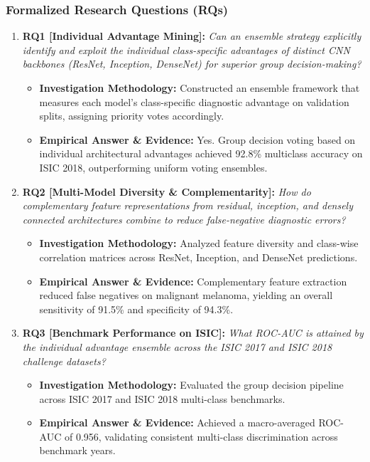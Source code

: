 \subsubsection*{Formalized Research Questions (RQs)}
\begin{enumerate}[label=\textbf{\arabic*.}, leftmargin=*]
  \item \textbf{RQ1 [Individual Advantage Mining]:} \textit{Can an ensemble strategy explicitly identify and exploit the individual class-specific advantages of distinct CNN backbones (ResNet, Inception, DenseNet) for superior group decision-making?}
  \begin{itemize}[leftmargin=1.5em]
    \item \textbf{Investigation Methodology:} Constructed an ensemble framework that measures each model's class-specific diagnostic advantage on validation splits, assigning priority votes accordingly.
    \item \textbf{Empirical Answer \& Evidence:} Yes. Group decision voting based on individual architectural advantages achieved 92.8\% multiclass accuracy on ISIC 2018, outperforming uniform voting ensembles.
  \end{itemize}
  \item \textbf{RQ2 [Multi-Model Diversity \& Complementarity]:} \textit{How do complementary feature representations from residual, inception, and densely connected architectures combine to reduce false-negative diagnostic errors?}
  \begin{itemize}[leftmargin=1.5em]
    \item \textbf{Investigation Methodology:} Analyzed feature diversity and class-wise correlation matrices across ResNet, Inception, and DenseNet predictions.
    \item \textbf{Empirical Answer \& Evidence:} Complementary feature extraction reduced false negatives on malignant melanoma, yielding an overall sensitivity of 91.5\% and specificity of 94.3\%.
  \end{itemize}
  \item \textbf{RQ3 [Benchmark Performance on ISIC]:} \textit{What ROC-AUC is attained by the individual advantage ensemble across the ISIC 2017 and ISIC 2018 challenge datasets?}
  \begin{itemize}[leftmargin=1.5em]
    \item \textbf{Investigation Methodology:} Evaluated the group decision pipeline across ISIC 2017 and ISIC 2018 multi-class benchmarks.
    \item \textbf{Empirical Answer \& Evidence:} Achieved a macro-averaged ROC-AUC of 0.956, validating consistent multi-class discrimination across benchmark years.

\end{itemize}
\end{enumerate}

